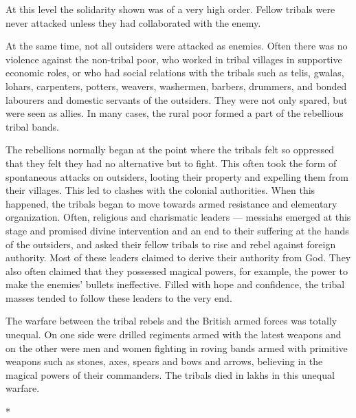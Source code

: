 At this level the solidarity shown was of a very high order. Fellow tribals were never attacked unless they had collaborated with the enemy.

At the same time, not all outsiders were attacked as enemies. Often there was no violence against the non-tribal poor, who worked in tribal villages in supportive economic roles, or who had social relations with the tribals such as telis, gwalas, lohars, carpenters, potters, weavers, washermen, barbers, drummers, and bonded labourers and domestic servants of the outsiders. They were not only spared, but were seen as allies. In many cases, the rural poor formed a part of the rebellious tribal bands.

The rebellions normally began at the point where the tribals felt so oppressed that they felt they had no alternative but to fight. This often took the form of spontaneous attacks on outsiders, looting their property and expelling them from their villages. This led to clashes with the colonial authorities. When this happened, the tribals began to move towards armed resistance and elementary organization. Often, religious and charismatic leaders — messiahs emerged at this stage and promised divine intervention and an end to their suffering at the hands of the outsiders, and asked their fellow tribals to rise and rebel against foreign authority. Most of these leaders claimed to derive their authority from God. They also often claimed that they possessed magical powers, for example, the power to make the enemies' bullets ineffective. Filled with hope and confidence, the tribal masses tended to follow these leaders to the very end.

The warfare between the tribal rebels and the British armed forces was totally unequal. On one side were drilled regiments armed with the latest weapons and on the other were men and women fighting in roving bands armed with primitive weapons such as stones, axes, spears and bows and arrows, believing in the magical powers of their commanders. The tribals died in lakhs in this unequal warfare.

\begin{center}*\end{center}

